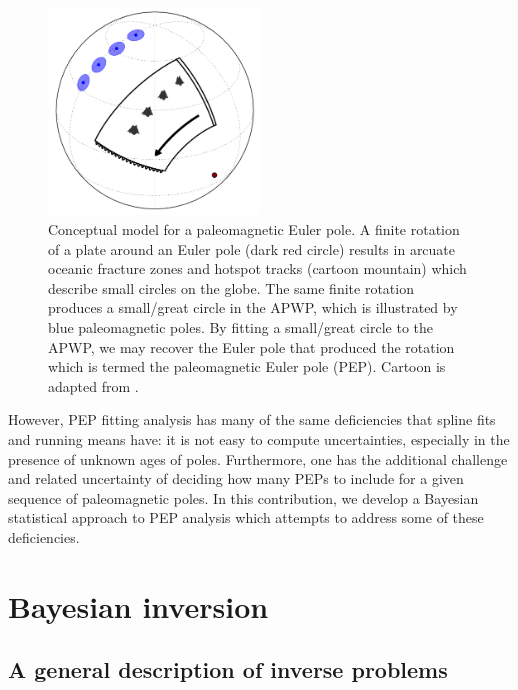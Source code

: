\documentclass[11pt,letterpaper]{article}
\begin{document}
\begin{figure}
\includegraphics[width=0.5\textwidth]{fig_paleomagnetic_euler_pole.png}
\caption{Conceptual model for a paleomagnetic Euler pole. A finite rotation of a plate around an Euler pole (dark red circle) results in arcuate oceanic fracture zones and hotspot tracks (cartoon mountain) which describe small circles on the globe. The same finite rotation produces a small/great circle in the APWP, which is illustrated by blue paleomagnetic poles. By fitting a small/great circle to the APWP, we may recover the Euler pole that produced the rotation which is termed the paleomagnetic Euler pole (PEP). Cartoon is adapted from \cite{Gordon1984a}.}
\label{fig:pep}
\end{figure}

However, PEP fitting analysis has many of the same deficiencies that spline fits and running means have: it is not easy to compute uncertainties, especially in the presence of unknown ages of poles. Furthermore, one has the additional challenge and related uncertainty of deciding how many PEPs to include for a given sequence of paleomagnetic poles. In this contribution, we develop a Bayesian statistical approach to PEP analysis which attempts to address some of these deficiencies.

\section*{Bayesian inversion}
\subsection*{A general description of inverse problems}
\end{document}
